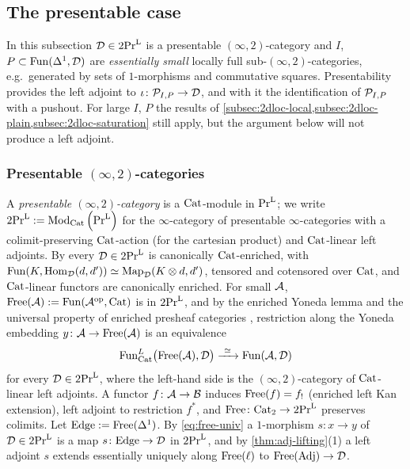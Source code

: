 \subsection{The presentable case}
\label{subsec:2dloc-presentable}

%
In this subsection $\mathcal{D} \in \operatorname{2Pr}^{\operatorname{L}}$ is a presentable $(\infty,2)$-category and
$I$,
$P \subset \operatorname{Fun}(\Delta^{1},\mathcal{D})$
are \emph{essentially small} locally full sub-$(\infty,2)$-categories,
e.g.\ generated by sets of $1$-morphisms and commutative squares.
Presentability provides the left adjoint to
$\iota\colon \mathcal{P}_{I,P} \to \mathcal{D}$,
and with it the identification of $\mathcal{P}_{I,P}$ with a pushout.
For large $I$, $P$ the results of
\cref{subsec:2dloc-local,subsec:2dloc-plain,subsec:2dloc-saturation} still
apply, but the argument below will not produce a left adjoint.

\subsubsection*{Presentable $(\infty,2)$-categories}
%
A \emph{presentable $(\infty,2)$-category} is a $\mathrm{Cat}$-module in $\operatorname{Pr}^{\operatorname{L}}$;
we write
$\operatorname{2Pr}^{\operatorname{L}} := {\operatorname{Mod}_{\mathrm{Cat}}\left(\operatorname{Pr}^{\operatorname{L}}\right)}$
for the $\infty$-category of presentable $\infty$-categories with a
colimit-preserving $\mathrm{Cat}$-action (for the cartesian product) and $\mathrm{Cat}$-linear
left adjoints.
By \cite{gepnerhaugseng2015enriched,heine2023enriched} every $\mathcal{D} \in \operatorname{2Pr}^{\operatorname{L}}$ is
canonically $\mathrm{Cat}$-enriched, with
$\operatorname{Fun}(K,\operatorname{Hom}_{\mathcal{D}}(d,d')) \simeq \operatorname{Map}_{\mathcal{D}}(K \otimes d,d')$,
tensored and cotensored over $\mathrm{Cat}$, and $\mathrm{Cat}$-linear functors are canonically
enriched.
For small $\mathcal{A}$,
$\operatorname{Free}(\mathcal{A}) := \operatorname{Fun}(\mathcal{A}^{\mathrm{op}},\mathrm{Cat})$
is in $\operatorname{2Pr}^{\operatorname{L}}$, and by the enriched Yoneda lemma and the universal property of
enriched presheaf categories \cite{hinich2020yoneda,heine2023enriched},
restriction along the Yoneda embedding
$y\colon \mathcal{A} \to \operatorname{Free}(\mathcal{A})$
is an equivalence
\begin{equation}
\label{eq:free-univ}
\operatorname{Fun}^{L}_{\mathrm{Cat}}\bigl(\operatorname{Free}(\mathcal{A}),\mathcal{D}\bigr) \xrightarrow{\ \simeq\ } \operatorname{Fun}(\mathcal{A},\mathcal{D})
\end{equation}
for every $\mathcal{D} \in \operatorname{2Pr}^{\operatorname{L}}$, where the left-hand side is the $(\infty,2)$-category
of $\mathrm{Cat}$-linear left adjoints.
A functor $f\colon \mathcal{A} \to \mathcal{B}$ induces $\operatorname{Free}(f) = f_{!}$ (enriched left Kan
extension), left adjoint to restriction $f^{*}$, and
$\operatorname{Free}\colon \mathrm{Cat}_{2} \to \operatorname{2Pr}^{\operatorname{L}}$
preserves colimits.
Let
$\mathrm{Edge} := \operatorname{Free}(\Delta^{1})$.
By \eqref{eq:free-univ} a $1$-morphism $s\colon x \to y$ of $\mathcal{D} \in \operatorname{2Pr}^{\operatorname{L}}$ is a
map $s\colon \mathrm{Edge} \to \mathcal{D}$ in $\operatorname{2Pr}^{\operatorname{L}}$, and by
\cref{thm:adj-lifting}(1) a left adjoint $s$ extends essentially
uniquely along $\operatorname{Free}(\ell)$ to $\operatorname{Free}(\mathrm{Adj}) \to \mathcal{D}$.

